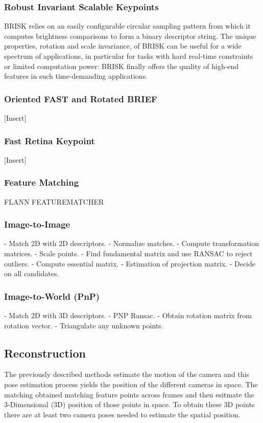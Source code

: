 \documentclass[a4paper]{article}
\begin{document}
\subsubsection*{Robust Invariant Scalable Keypoints}
BRISK relies on an easily conﬁgurable circular sampling pattern from which it computes brightness comparisons to form a binary descriptor string. The unique properties, rotation and scale invariance, of BRISK can be useful for a wide spectrum of applications, in particular for tasks with hard real-time constraints or limited computation power: BRISK ﬁnally offers the quality of high-end features in such time-demanding applications.

\subsubsection*{Oriented FAST and Rotated BRIEF}
[Insert]
\subsubsection*{Fast Retina Keypoint}
[Insert]

\subsubsection{Feature Matching}
FLANN FEATUREMATCHER \cite{Muja2009}

\subsubsection{Image-to-Image}
- Match 2D with 2D descriptors.
- Normalize matches.
- Compute transformation matrices.
- Scale points.
- Find fundamental matrix and use RANSAC to reject outliers.
- Compute essential matrix.
- Estimation of projection matrix.
- Decide on all candidates.

\subsubsection{Image-to-World (PnP)}
- Match 2D with 3D descriptors.
- PNP Ransac.
- Obtain rotation matrix from rotation vector.
- Triangulate any unknown points.


\subsection{Reconstruction}
The previously described methods estimate the motion of the camera and this pose estimation process yields the position of the different cameras in space. The matching obtained matching feature points across frames and then esitmate the 3-Dimensional (3D) position of those points in space. To obtain these 3D points there are at least two camera poses needed to estimate the spatial position.
\end{document}
